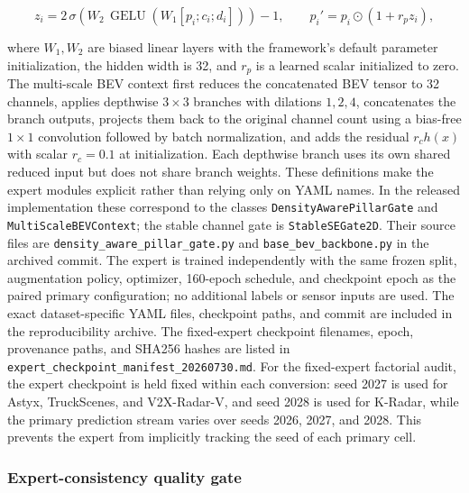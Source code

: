 \documentclass[sensors,article,submit,pdftex,moreauthors]{Definitions/mdpi}
\begin{document}
\begin{equation}
z_i=2\,\sigma\!\left(W_2\,\operatorname{GELU}\!\left(W_1[p_i;c_i;d_i]\right)\right)-1,
\qquad p_i' = p_i\odot(1+r_p z_i),
\end{equation}

where $W_1,W_2$ are biased linear layers with the framework's default parameter
initialization, the hidden width is 32, and $r_p$ is a learned scalar
initialized to zero. The multi-scale
BEV context first reduces the concatenated BEV tensor to 32 channels, applies
depthwise $3\times3$ branches with dilations $1,2,4$, concatenates the branch
outputs, projects them back to the original channel count using a bias-free
$1\times1$ convolution followed by batch normalization, and adds the residual
$r_c h(x)$ with scalar $r_c=0.1$ at initialization. Each depthwise branch uses
its own shared reduced input but does not share branch weights. These definitions make
the expert modules explicit rather than relying only on YAML names. In the
released implementation these correspond to the classes
\texttt{DensityAwarePillarGate} and \texttt{MultiScaleBEVContext}; the stable
channel gate is \texttt{StableSEGate2D}. Their source files are
\texttt{density\_aware\_pillar\_gate.py} and
\texttt{base\_bev\_backbone.py} in the archived commit. The expert
is trained independently with the
same frozen split, augmentation policy, optimizer, 160-epoch schedule, and
checkpoint epoch as the paired primary configuration; no additional labels or
sensor inputs are used. The exact dataset-specific YAML files, checkpoint
paths, and commit are included in the reproducibility archive.
The fixed-expert checkpoint filenames, epoch, provenance paths, and SHA256
hashes are listed in
\texttt{expert\_checkpoint\_manifest\_20260730.md}.
For the fixed-expert factorial audit, the expert checkpoint is held fixed
within each conversion: seed 2027 is used for Astyx, TruckScenes, and
V2X-Radar-V, and seed 2028 is used for K-Radar, while the primary prediction
stream varies over seeds 2026, 2027, and 2028. This prevents the expert from
implicitly tracking the seed of each primary cell.

\subsubsection{Expert-consistency quality gate}
\end{document}
